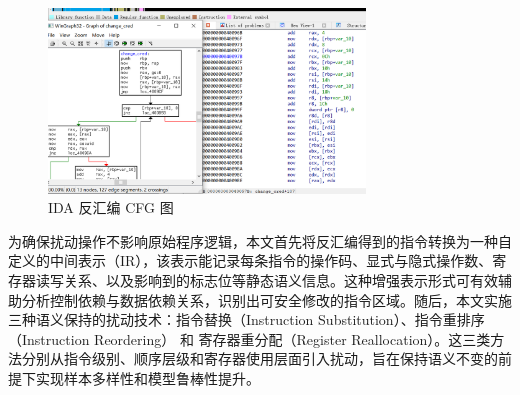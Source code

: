 
\begin{figure}[hbt]
	\centering
	\includegraphics[width=0.75\textwidth]{figures/4.1}
	\caption{IDA 反汇编 CFG 图}\label{fig:4.1}
\end{figure}


为确保扰动操作不影响原始程序逻辑，本文首先将反汇编得到的指令转换为一种自定义的中间表示（IR），该表示能记录每条指令的操作码、显式与隐式操作数、寄存器读写关系、以及影响到的标志位等静态语义信息。这种增强表示形式可有效辅助分析控制依赖与数据依赖关系，识别出可安全修改的指令区域。随后，本文实施三种语义保持的扰动技术：指令替换（Instruction Substitution）、指令重排序（Instruction Reordering） 和 寄存器重分配（Register Reallocation）。这三类方法分别从指令级别、顺序层级和寄存器使用层面引入扰动，旨在保持语义不变的前提下实现样本多样性和模型鲁棒性提升。

